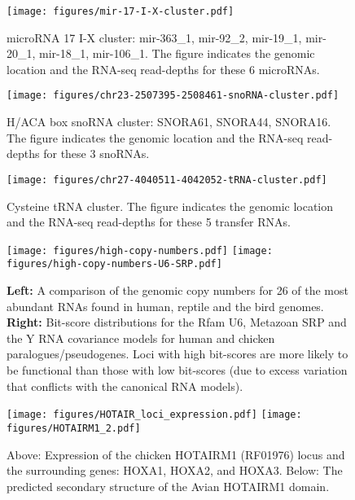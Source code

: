 \documentclass[10pt]{bmc_article}
\newenvironment{bmcformat}{\begin{raggedright}\baselineskip20pt\sloppy\setboolean{publ}{false}}{\end{raggedright}\baselineskip20pt\sloppy}
\begin{document}
\begin{bmcformat}
\begin{figure}[ht]
\texttt{[image: figures/mir-17-I-X-cluster.pdf]}
  \caption[]{microRNA 17 I-X cluster: mir-363\_1, mir-92\_2,
    mir-19\_1, mir-20\_1, mir-18\_1, mir-106\_1. The figure indicates
    the genomic location and the RNA-seq read-depths for these 6
    microRNAs.}\label{fig:11}
\end{figure}

\begin{figure}[ht]
\texttt{[image: figures/chr23-2507395-2508461-snoRNA-cluster.pdf]}
  \caption[]{H/ACA box snoRNA cluster: SNORA61, SNORA44, SNORA16. The figure indicates
    the genomic location and the RNA-seq read-depths for these 3
    snoRNAs.}\label{fig:12}
\end{figure}

\begin{figure}[ht]
\texttt{[image: figures/chr27-4040511-4042052-tRNA-cluster.pdf]}
  \caption[]{Cysteine tRNA cluster. The figure indicates
    the genomic location and the RNA-seq read-depths for these 5
    transfer RNAs.}\label{fig:13}
\end{figure}

\begin{figure}[ht]
\texttt{[image: figures/high-copy-numbers.pdf]}
\texttt{[image: figures/high-copy-numbers-U6-SRP.pdf]}
  \caption[]{{\bf Left:} A comparison of the genomic copy numbers for
    26 of the most abundant RNAs found in human, reptile and the bird
    genomes. {\bf Right:} Bit-score distributions for the Rfam U6,
    Metazoan SRP and the Y RNA covariance models for human and chicken
    paralogues/pseudogenes. Loci with high bit-scores are more likely
    to be functional than those with low bit-scores (due to excess
    variation that conflicts with the canonical RNA
    models).}\label{fig:14}
\end{figure}

\clearpage
\newpage

\begin{figure}[ht]
\texttt{[image: figures/HOTAIR\_loci\_expression.pdf]}
\texttt{[image: figures/HOTAIRM1\_2.pdf]}
  \caption[]{Above: Expression of the chicken HOTAIRM1 (RF01976) locus
    and the surrounding genes: HOXA1, HOXA2, and HOXA3. Below: The
    predicted secondary structure of the Avian HOTAIRM1 domain.}\label{fig:15}
\end{figure}


\end{bmcformat}
\end{document}

